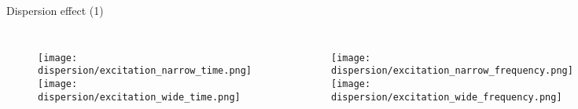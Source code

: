 \documentclass[10pt,aspectratio=169]{beamer} %
\begin{document}
\note{
	
}
\begin{frame}{Dispersion effect (1)}
	\begin{columns}[T]
		\begin{figure}
			\texttt{[image: dispersion/excitation\_narrow\_time.png]}
			\texttt{[image: dispersion/excitation\_wide\_time.png]}
		\end{figure}
		\newcommand{\modelname}{dispersion_effect}
		\begin{figure}
			\texttt{[image: dispersion/excitation\_narrow\_frequency.png]}
			\texttt{[image: dispersion/excitation\_wide\_frequency.png]}
		\end{figure}
	\end{columns}
\end{frame}
\end{document}
